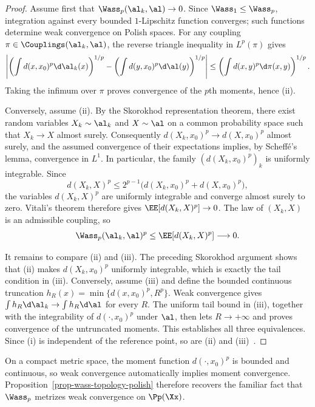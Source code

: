 \begin{proof}
	Assume first that $\Wass_p(\al_k,\al)\to0$. Since $\Wass_1\leq\Wass_p$, integration against every bounded $1$-Lipschitz function converges; such functions determine weak convergence on Polish spaces. For any coupling $\pi\in\Couplings(\al_k,\al)$, the reverse triangle inequality in $L^p(\pi)$ gives
	\[
		\left|
		\left(\int d(x,x_0)^p\d\al_k(x)\right)^{1/p}
		-
		\left(\int d(y,x_0)^p\d\al(y)\right)^{1/p}
		\right|
		\leq
		\left(\int d(x,y)^p\d\pi(x,y)\right)^{1/p}.
	\]
	Taking the infimum over $\pi$ proves convergence of the $p$th moments, hence (ii).

	Conversely, assume (ii). By the Skorokhod representation theorem, there exist random variables $X_k\sim\al_k$ and $X\sim\al$ on a common probability space such that $X_k\to X$ almost surely. Consequently $d(X_k,x_0)^p\to d(X,x_0)^p$ almost surely, and the assumed convergence of their expectations implies, by Scheff\'e's lemma, convergence in $L^1$. In particular, the family $(d(X_k,x_0)^p)_k$ is uniformly integrable. Since
	\[
		d(X_k,X)^p
		\leq 2^{p-1}\bigl(d(X_k,x_0)^p+d(X,x_0)^p\bigr),
	\]
	the variables $d(X_k,X)^p$ are uniformly integrable and converge almost surely to zero. Vitali's theorem therefore gives $\EE[d(X_k,X)^p]\to0$. The law of $(X_k,X)$ is an admissible coupling, so
	\[
		\Wass_p(\al_k,\al)^p\leq\EE[d(X_k,X)^p]\longrightarrow0.
	\]

	It remains to compare (ii) and (iii). The preceding Skorokhod argument shows that (ii) makes $d(X_k,x_0)^p$ uniformly integrable, which is exactly the tail condition in (iii). Conversely, assume (iii) and define the bounded continuous truncation $h_R(x)=\min\{d(x,x_0)^p,R^p\}$. Weak convergence gives $\int h_R\d\al_k\to\int h_R\d\al$ for every $R$. The uniform tail bound in (iii), together with the integrability of $d(\cdot,x_0)^p$ under $\al$, then lets $R\to+\infty$ and proves convergence of the untruncated moments. This establishes all three equivalences. Since (i) is independent of the reference point, so are (ii) and (iii)~\cite{Villani09,SantambrogioBook,ambrosio2006gradient}.
\end{proof}

On a compact metric space, the moment function $d(\cdot,x_0)^p$ is bounded and continuous, so weak convergence automatically implies moment convergence. Proposition~\ref{prop-wass-topology-polish} therefore recovers the familiar fact that $\Wass_p$ metrizes weak convergence on $\Pp(\Xx)$.

